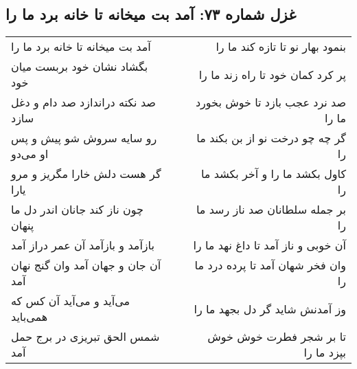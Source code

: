 \begin{center}
\section*{غزل شماره ۷۳: آمد بت میخانه تا خانه برد ما را}
\label{sec:0073}
\begin{longtable}{l p{0.5cm} r}
آمد بت میخانه تا خانه برد ما را
&&
بنمود بهار نو تا تازه کند ما را
\\
بگشاد نشان خود بربست میان خود
&&
پر کرد کمان خود تا راه زند ما را
\\
صد نکته دراندازد صد دام و دغل سازد
&&
صد نرد عجب بازد تا خوش بخورد ما را
\\
رو سایه سروش شو پیش و پس او می‌دو
&&
گر چه چو درخت نو از بن بکند ما را
\\
گر هست دلش خارا مگریز و مرو یارا
&&
کاول بکشد ما را و آخر بکشد ما را
\\
چون ناز کند جانان اندر دل ما پنهان
&&
بر جمله سلطانان صد ناز رسد ما را
\\
بازآمد و بازآمد آن عمر دراز آمد
&&
آن خوبی و ناز آمد تا داغ نهد ما را
\\
آن جان و جهان آمد وان گنج نهان آمد
&&
وان فخر شهان آمد تا پرده درد ما را
\\
می‌آید و می‌آید آن کس که همی‌باید
&&
وز آمدنش شاید گر دل بجهد ما را
\\
شمس الحق تبریزی در برج حمل آمد
&&
تا بر شجر فطرت خوش خوش بپزد ما را
\\
\end{longtable}
\end{center}
